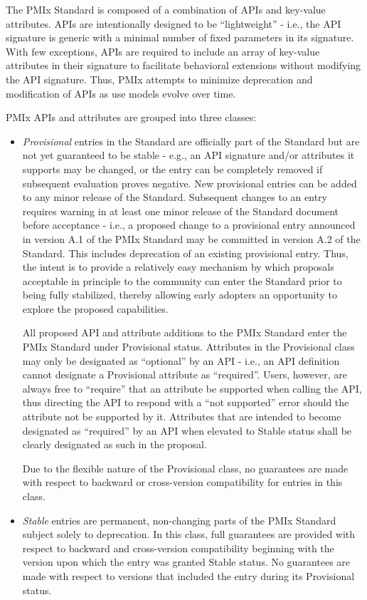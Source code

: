 \documentclass{article}
\begin{document}
The PMIx Standard is composed of a combination of APIs and key-value
attributes. APIs are intentionally designed to be ``lightweight'' -
i.e., the API signature is generic with a minimal number of fixed
parameters in its signature. With few exceptions, APIs are required to
include an array of key-value attributes in their signature to
facilitate behavioral extensions without modifying the API signature.
Thus, PMIx attempts to minimize deprecation and modification of APIs as
use models evolve over time.

PMIx APIs and attributes are grouped into three classes:

\begin{itemize}
\item
  \textit{Provisional} entries in the Standard are officially part
  of the Standard but are not yet guaranteed to be stable - e.g., an API
  signature and/or attributes it supports may be changed, or the entry
  can be completely removed if subsequent evaluation proves negative.
  New provisional entries can be added to any minor release of the
  Standard. Subsequent changes to an entry requires warning in at least
  one minor release of the Standard document before acceptance - i.e., a
  proposed change to a provisional entry announced in version A.1 of the
  PMIx Standard may be committed in version A.2 of the Standard. This
  includes deprecation of an existing provisional entry. Thus, the
  intent is to provide a relatively easy mechanism by which proposals
  acceptable in principle to the community can enter the Standard prior
  to being fully stabilized, thereby allowing early adopters an
  opportunity to explore the proposed capabilities.

  All proposed API and attribute additions to the PMIx Standard enter the PMIx Standard
  under Provisional status. Attributes in the Provisional class may
  only be designated as ``optional'' by an API - i.e., an API definition
  cannot designate a Provisional attribute as ``required''. Users,
  however, are always free to ``require'' that an attribute be supported
  when calling the API, thus directing the API to respond with a ``not
  supported'' error should the attribute not be supported by it.
  Attributes that are intended to become designated as ``required'' by
  an API when elevated to Stable status shall be clearly designated
  as such in the proposal.

  Due to the flexible nature of the Provisional class, no guarantees are
  made with respect to backward or cross-version compatibility for
  entries in this class.
\item
  \textit{Stable} entries are permanent, non-changing parts of the
  PMIx Standard subject solely to deprecation. In this class, full
  guarantees are provided with respect to backward and cross-version
  compatibility beginning with the version upon which the entry was
  granted Stable status. No guarantees are made with respect to
  versions that included the entry during its Provisional status.


\end{itemize}
\end{document}
